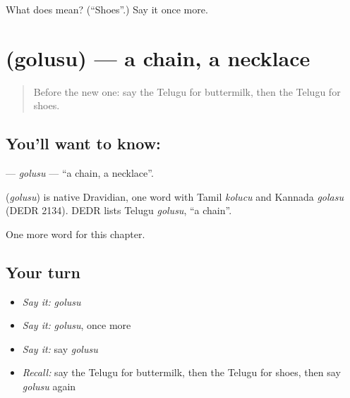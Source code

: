\begin{tcolorbox}[breakable,colback=teal!4,colframe=teal!35!black,title={Before you move on}]
What does  mean? (\textquotedblleft{}Shoes\textquotedblright{}.) Say it once more.
\end{tcolorbox}
\section[\texorpdfstring{\te{గొలుసు} (golusu)}{గొలుసు (golusu)}]{ (golusu) — a chain, a necklace}

\label{lesson:TE-C300-golusu}



\begin{quote}
Before the new one: say the Telugu for buttermilk, then the Telugu for shoes.
\end{quote}

\subsection*{You'll want to know: }
\textbf{} — \emph{golusu} — \textquotedblleft{}a chain, a necklace\textquotedblright{}.

\begin{cousinweb}
\textbf{} (\emph{golusu}) is native Dravidian, one word with Tamil \emph{kolucu} and Kannada \emph{golasu} (DEDR 2134). DEDR lists Telugu \emph{golusu}, \textquotedblleft{}a chain\textquotedblright{}.
\end{cousinweb}

\begin{grammarlens}[title={What you've built}]
One more word for this chapter.
\end{grammarlens}

\subsection*{Your turn}
\begin{itemize}
\raggedright
  \item \emph{Say it:} \emph{golusu}
  \item \emph{Say it:} \emph{golusu}, once more
  \item \emph{Say it:} say \emph{golusu}
  \item \emph{Recall:} say the Telugu for buttermilk, then the Telugu for shoes, then say \emph{golusu} again
\end{itemize}

